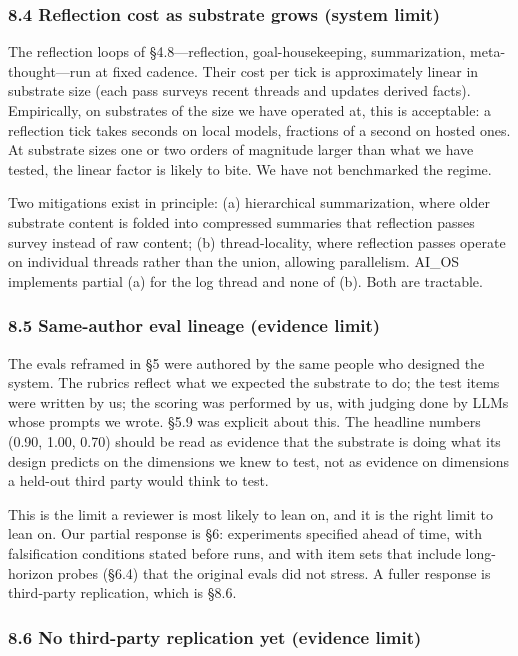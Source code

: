 \documentclass[11pt,letterpaper]{article}
\begin{document}
\subsubsection*{8.4 Reflection cost as substrate grows (system limit)}

The reflection loops of §4.8---reflection, goal-housekeeping, summarization, meta-thought---run at fixed cadence. Their cost per tick is approximately linear in substrate size (each pass surveys recent threads and updates derived facts). Empirically, on substrates of the size we have operated at, this is acceptable: a reflection tick takes seconds on local models, fractions of a second on hosted ones. At substrate sizes one or two orders of magnitude larger than what we have tested, the linear factor is likely to bite. We have not benchmarked the regime.

Two mitigations exist in principle: (a) hierarchical summarization, where older substrate content is folded into compressed summaries that reflection passes survey instead of raw content; (b) thread-locality, where reflection passes operate on individual threads rather than the union, allowing parallelism. AI\_OS implements partial (a) for the log thread and none of (b). Both are tractable.

\subsubsection*{8.5 Same-author eval lineage (evidence limit)}

The evals reframed in §5 were authored by the same people who designed the system. The rubrics reflect what we expected the substrate to do; the test items were written by us; the scoring was performed by us, with judging done by LLMs whose prompts we wrote. §5.9 was explicit about this. The headline numbers (0.90, 1.00, 0.70) should be read as evidence that the substrate is doing what its design predicts on the dimensions we knew to test, not as evidence on dimensions a held-out third party would think to test.

This is the limit a reviewer is most likely to lean on, and it is the right limit to lean on. Our partial response is §6: experiments specified ahead of time, with falsification conditions stated before runs, and with item sets that include long-horizon probes (§6.4) that the original evals did not stress. A fuller response is third-party replication, which is §8.6.

\subsubsection*{8.6 No third-party replication yet (evidence limit)}
\end{document}
